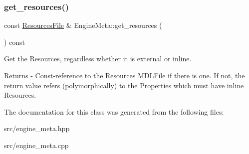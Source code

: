 \subsubsection{\texorpdfstring{get\+\_\+resources()}{get\_resources()}}
{\footnotesize\ttfamily const \mbox{\hyperlink{class_resources_file}{Resources\+File}} \& Engine\+Meta\+::get\+\_\+resources (\begin{DoxyParamCaption}{ }\end{DoxyParamCaption}) const}

Get the Resources, regardless whether it is external or inline. \begin{DoxyReturn}{Returns}
-\/ Const-\/reference to the Resources M\+D\+L\+File if there is one. If not, the return value refers (polymorphically) to the Properties which must have inline Resources. 
\end{DoxyReturn}


The documentation for this class was generated from the following files\+:\begin{DoxyCompactItemize}
\item 
src/engine\+\_\+meta.\+hpp\item 
src/engine\+\_\+meta.\+cpp\end{DoxyCompactItemize}
